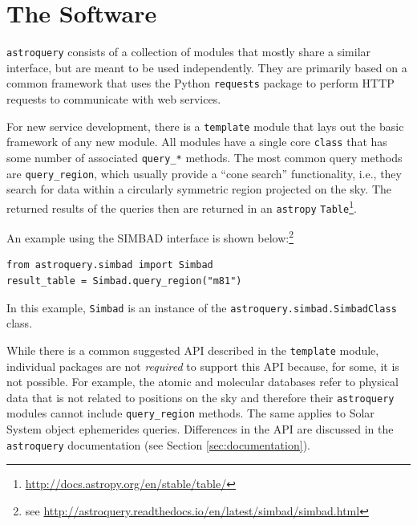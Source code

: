\documentclass[twocolumn]{aastex62}
\newcommand{\package}[1]{\texttt{#1}\xspace}
\newcommand{\astroquery}{\package{astroquery}}
\newcommand{\astropypkg}{\package{astropy}}
\begin{document}


\section{The Software}
\label{sec:software}
\astroquery consists of a collection of modules that mostly share a similar
interface, but are meant to be used independently.  They are primarily based on
a common framework that uses the Python \package{requests} package to perform
HTTP requests to communicate with web services.

For new service development, there is a \texttt{template} module that lays
out the basic framework of any new module.  All modules have a single core
\texttt{class} that has some number of associated \texttt{query\_*} methods.
The most common query methods are \texttt{query\_region}, which usually
provide a ``cone search'' functionality, i.e., they search for data within a
circularly symmetric region projected on the sky. The returned results of
the queries then are returned in an \astropypkg
\citep{Astropy-Collaboration2018, Astropy-Collaboration2013}
\texttt{Table}\footnote{\url{http://docs.astropy.org/en/stable/table/}}.

An example using the SIMBAD interface is shown below:\footnote{see
\url{http://astroquery.readthedocs.io/en/latest/simbad/simbad.html}}
\begin{lstlisting}[caption=Query SIMBAD for a region around M81]
from astroquery.simbad import Simbad
result_table = Simbad.query_region("m81")
\end{lstlisting}
In this example, \texttt{Simbad} is an instance of the
\texttt{astroquery.simbad.SimbadClass} class.

While there is a common suggested API described in the \texttt{template} module,
individual packages are not \emph{required} to support this API because, for
some, it is not possible.  For example, the atomic and molecular databases refer
to physical data that is not related to positions on the sky and therefore
their \astroquery modules cannot include \texttt{query\_region} methods. The
same applies to Solar System object ephemerides queries. Differences in the API
are discussed in the \astroquery documentation (see Section
\ref{sec:documentation}).
\end{document}
